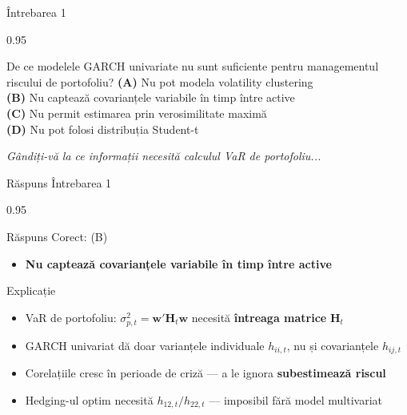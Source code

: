 \documentclass[9pt, aspectratio=169, t]{beamer}
\begin{document}
\begin{frame}{Întrebarea 1}
    \begin{cminipage}{0.95\textwidth}
    \begin{block}{De ce modelele GARCH univariate nu sunt suficiente pentru managementul riscului de portofoliu?}
        \textcolor{MainBlue}{\textbf{(A)}} Nu pot modela volatility clustering\\[3pt]
        \textcolor{MainBlue}{\textbf{(B)}} Nu captează covarianțele variabile în timp între active\\[3pt]
        \textcolor{MainBlue}{\textbf{(C)}} Nu permit estimarea prin verosimilitate maximă\\[3pt]
        \textcolor{MainBlue}{\textbf{(D)}} Nu pot folosi distribuția Student-t
    \end{block}

    \vspace{0.5cm}

    \begin{center}
        \textit{Gândiți-vă la ce informații necesită calculul VaR de portofoliu...}
    \end{center}
    \end{cminipage}
\end{frame}

\begin{frame}{Răspuns Întrebarea 1}
    \begin{cminipage}{0.95\textwidth}
    \begin{exampleblock}{Răspuns Corect: (B)}
        \begin{itemize}\setlength{\itemsep}{0pt}
            \item \textbf{Nu captează covarianțele variabile în timp între active}
        \end{itemize}
    \end{exampleblock}

    \pause
    \begin{block}{Explicație}
        \begin{itemize}\setlength{\itemsep}{0pt}
            \item VaR de portofoliu: $\sigma_{p,t}^2 = \mathbf{w}'\mathbf{H}_t\mathbf{w}$ necesită \textbf{întreaga matrice} $\mathbf{H}_t$
            \item GARCH univariat dă doar varianțele individuale $h_{ii,t}$, nu și covarianțele $h_{ij,t}$
            \item Corelațiile cresc în perioade de criză --- a le ignora \textbf{subestimează riscul}
            \item Hedging-ul optim necesită $h_{12,t}/h_{22,t}$ --- imposibil fără model multivariat
        \end{itemize}
    \end{block}
    \end{cminipage}
\end{frame}
\end{document}
